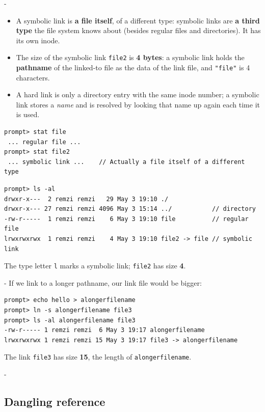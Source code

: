 \documentclass[11pt,a4paper]{article}
\makeatletter
\newcommand{\keepspace}[1]{\par\penalty-100\begingroup
  \setlength{\dimen@}{#1}\dimen@ii\pagegoal\advance\dimen@ii-\pagetotal
  \ifdim\dimen@>\dimen@ii\ifdim\dimen@ii>\z@\vfil\fi\break\fi\endgroup}
\makeatother
\begin{document}
\keepspace{7\baselineskip}
\begin{quizbox}
\begin{itemize}
  \item A symbolic link is \textbf{a file itself}, of a different type:
        symbolic links are \textbf{a third type} the file system knows about
        (besides regular files and directories). It has its own inode.
  \item The size of the symbolic link \texttt{file2} is \textbf{4 bytes}: a
        symbolic link holds the \textbf{pathname} of the linked-to file as
        the data of the link file, and \texttt{"file"} is 4 characters.
  \item A hard link is only a directory entry with the same inode number; a
        symbolic link stores a \emph{name} and is resolved by looking that
        name up again each time it is used.
\end{itemize}
\end{quizbox}

\begin{lstlisting}[style=term]
prompt> stat file
 ... regular file ...
prompt> stat file2
 ... symbolic link ...    // Actually a file itself of a different type
\end{lstlisting}

\begin{lstlisting}[style=term]
prompt> ls -al
drwxr-x---  2 remzi remzi   29 May 3 19:10 ./
drwxr-x--- 27 remzi remzi 4096 May 3 15:14 ../           // directory
-rw-r-----  1 remzi remzi    6 May 3 19:10 file          // regular file
lrwxrwxrwx  1 remzi remzi    4 May 3 19:10 file2 -> file // symbolic link
\end{lstlisting}

The type letter \texttt{l} marks a symbolic link; \texttt{file2} has size
\textbf{4}.

\keepspace{7\baselineskip}
If we link to a longer pathname, our link file would be bigger:
\begin{lstlisting}[style=term]
prompt> echo hello > alongerfilename
prompt> ln -s alongerfilename file3
prompt> ls -al alongerfilename file3
-rw-r----- 1 remzi remzi  6 May 3 19:17 alongerfilename
lrwxrwxrwx 1 remzi remzi 15 May 3 19:17 file3 -> alongerfilename
\end{lstlisting}
The link \texttt{file3} has size \textbf{15}, the length of
\texttt{alongerfilename}.

\keepspace{7\baselineskip}
\subsection{Dangling reference}
\end{document}
